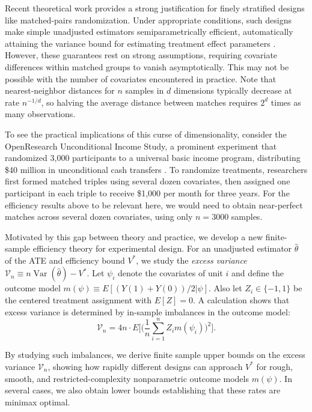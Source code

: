 \documentclass[letterpaper,12pt]{article}
\theoremstyle{definition}
\numberwithin{equation}{section}
\newcommand{\mc}{\mathcal}
\DeclareMathOperator{\var}{Var}
\begin{document}
Recent theoretical work provides a strong justification for finely stratified designs like matched-pairs randomization.
Under appropriate conditions, such designs make simple unadjusted estimators semiparametrically efficient, automatically attaining the \citet{hahn1998} variance bound for estimating treatment effect parameters \citep{bai2021inference,bai2023efficiency}.
However, these guarantees rest on strong assumptions, requiring covariate differences within matched groups to vanish asymptotically. 
This may not be possible with the number of covariates encountered in practice.
Note that nearest-neighbor distances for $n$ samples in $d$ dimensions typically decrease at rate $n^{-1/d}$, so halving the average distance between matches requires $2^d$ times as many observations.

To see the practical implications of this curse of dimensionality, consider the OpenResearch Unconditional Income Study, a prominent experiment that randomized 3,000 participants to a universal basic income program, distributing \$40 million in unconditional cash transfers \citep{broockman2024income}.
To randomize treatments, researchers first formed matched triples using several dozen covariates, then assigned one participant in each triple to receive \$1,000 per month for three years.
For the efficiency results above to be relevant here, we would need to obtain near-perfect matches across several dozen covariates, using only $n=3000$ samples.

Motivated by this gap between theory and practice, we develop a new finite-sample efficiency theory for experimental design.
For an unadjusted estimator $\widehat{\theta}$ of the ATE and efficiency bound $V^*$, we study the \emph{excess variance} $\mc V_n\equiv n\var(\widehat\theta)-V^*$.
Let $\psi_i$ denote the covariates of unit $i$ and define the outcome model $m(\psi)\equiv E[(Y(1)+Y(0))/2|\psi]$.
Also let $Z_i\in\{-1,1\}$ be the centered treatment assignment with $E[Z] = 0$.
A calculation shows that excess variance is determined by in-sample imbalances in the outcome model:
\begin{equation}\label{equation:introduction-excess-variance}
\mc V_n = 4n \cdot E\bigg[\bigg(\frac{1}{n}\sum_{i=1}^n Z_i m(\psi_i)\bigg)^2\bigg].
\end{equation}

By studying such imbalances, we derive finite sample upper bounds on the excess variance $\mc V_n$, showing how rapidly different designs can approach $V^*$ for rough, smooth, and restricted-complexity nonparametric outcome models $m(\psi)$.
In several cases, we also obtain lower bounds establishing that these rates are minimax optimal.
\end{document}
